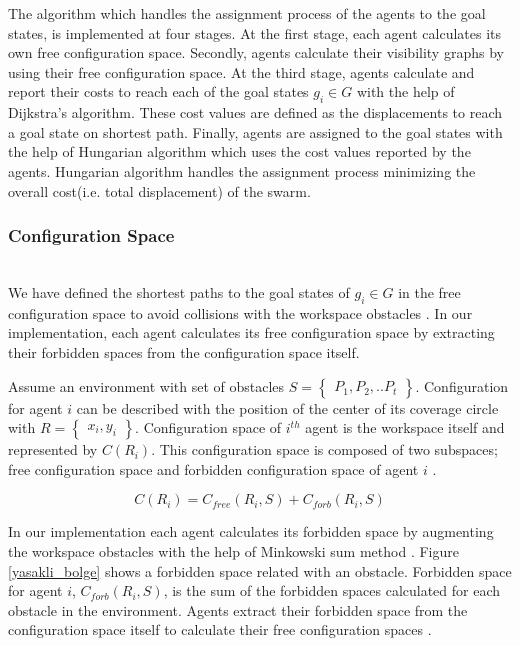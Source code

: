\documentclass[letterpaper, 10 pt, conference]{ieeeconf}  %
\begin{document}
The algorithm which handles the assignment process of the agents to the goal states, is implemented at four stages. At the first stage, each agent calculates its own free configuration space. Secondly, agents calculate their visibility graphs by using their free configuration space. At the third stage,  agents calculate and report their costs to reach each of the goal states $g_i \in G$ with the help of Dijkstra's algorithm. These cost values are defined as the displacements to reach a goal state on shortest path.  Finally, agents are assigned to the goal states with the help of Hungarian algorithm which uses the cost values reported by the agents. Hungarian algorithm handles the assignment process minimizing the overall cost(i.e. total displacement) of the swarm.
	
\subsubsection{Configuration Space}\hspace{0pt} \\
We have defined the shortest paths to the goal states of $g_i \in G$ in the free configuration space to avoid collisions with the workspace obstacles \cite{92}. In our implementation, each agent calculates its free configuration space by extracting their forbidden spaces from the configuration space itself.

Assume an environment with set of obstacles $S = \begin{Bmatrix}
P_1, P_2, .. P_t \end{Bmatrix}$. Configuration for agent $i$ can be described with the position of the center of its coverage circle with $R=\begin{Bmatrix}x_i, y_i\end{Bmatrix}$. Configuration space of $i^{th}$ agent is the workspace itself and represented by $C(R_i)$. This configuration space is composed of two subspaces; free configuration space and forbidden configuration space of agent $i$ \cite{92}.

\begin{equation}
C(R_i) = C_{free}(R_i,S) + C_{forb}(R_i,S)
\end{equation}

In our implementation each agent calculates its forbidden space by augmenting the workspace obstacles with the help of Minkowski sum method \cite{92}. Figure \ref{yasakli_bolge} shows a forbidden space related with an obstacle. Forbidden space for agent $i$, $C_{forb}(R_i, S)$, is the sum of the forbidden spaces calculated for each obstacle in the environment. Agents extract their forbidden space from the configuration space itself to calculate their free configuration spaces \cite{92}.
\end{document}
